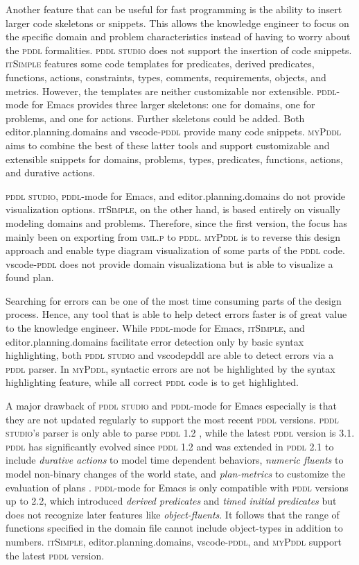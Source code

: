 \documentclass[runningheads]{llncs}
\newcommand{\mypddl}{\textsc{myPddl}\xspace}
\newcommand{\pddlstudio}{\textsc{pddl studio}\xspace}
\newcommand{\epd}{editor.planning.domains\xspace}
\newcommand{\itsimple}{\textsc{itSimple}\xspace}
\newcommand{\pddlmode}{\textsc{pddl}-mode\xspace}
\newcommand{\pddl}{\textsc{pddl}\xspace}
\begin{document}
Another feature that can be useful for fast programming is the ability
to insert larger code skeletons or snippets. This allows the knowledge
engineer to focus on the specific domain and problem characteristics
instead of having to worry about the \pddl formalities. \pddlstudio
does not support the insertion of code snippets. \itsimple features
some code templates for predicates, derived predicates, functions,
actions, constraints, types, comments, requirements, objects, and
metrics. However, the templates are neither customizable nor
extensible. \pddlmode for Emacs provides three larger skeletons: one
for domains, one for problems, and one for actions. Further skeletons
could be added. Both \epd and vscode-\pddl provide many code
snippets. \mypddl aims to combine the best of these latter tools and
support customizable and extensible snippets for domains, problems,
types, predicates, functions, actions, and durative actions.

\pddlstudio, \pddlmode for Emacs, and \epd do not provide
visualization options. \itsimple, on the other hand, is based entirely
on visually modeling domains and problems. Therefore, since the first
version, the focus has mainly been on exporting from \textsc{uml.p} to
\pddl. \mypddl is to reverse this design approach and enable type
diagram visualization of some parts of the \pddl code. vscode-\pddl
does not provide domain visualizationa but is able to visualize a
found plan.

Searching for errors can be one of the most time consuming parts of
the design process. Hence, any tool that is able to help detect errors
faster is of great value to the knowledge engineer. While \pddlmode
for Emacs, \itsimple, and \epd facilitate error detection only by
basic syntax highlighting, both \pddlstudio and vscode\-pddl are able
to detect errors via a \pddl parser. In \mypddl, syntactic errors are
not be highlighted by the syntax highlighting feature, while all
correct \pddl code is to get highlighted.

A major drawback of \pddlstudio and \pddlmode for Emacs especially is
that they are not updated regularly to support the most recent \pddl
versions. \pddlstudio's parser is only able to parse \pddl 1.2
\cite{chomuttool}, while the latest \pddl version is 3.1. \pddl has
significantly evolved since \pddl 1.2 and was extended in \pddl 2.1 to
include \emph{durative actions} to model time dependent behaviors,
\emph{numeric fluents} to model non-binary changes of the world state,
and \emph{plan-metrics} to customize the evaluation of plans
\cite{fox2003pddl2}. \pddlmode for Emacs is only compatible with \pddl
versions up to 2.2, which introduced \emph{derived predicates} and
\emph{timed initial predicates} \cite{edelkamp2004pddl2} but does not
recognize later features like \emph{object-fluents}. It follows that
the range of functions specified in the domain file cannot include
object-types in addition to numbers. \itsimple, \epd, vscode-\pddl,
and \mypddl support the latest \pddl version.
\end{document}
